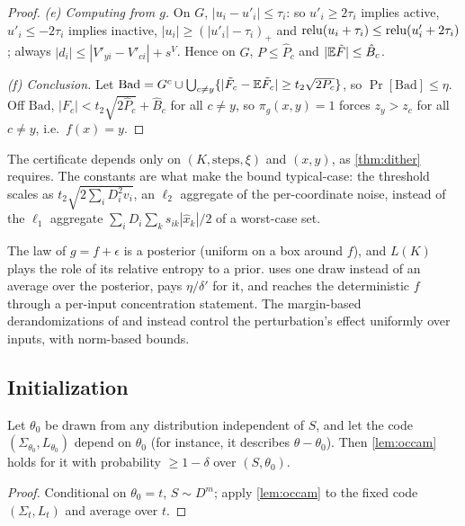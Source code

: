 \begin{proof}
\emph{(e) Computing from $g$.} On $G$, $|u_i-u'_i|\le\tau_i$: so $u'_i\ge2\tau_i$ implies active, $u'_i\le-2\tau_i$ implies inactive, $|u_i|\ge(|u'_i|-\tau_i)_+$ and $\mathrm{relu}(u_i+\tau_i)\le\mathrm{relu}(u'_i+2\tau_i)$; always $|d_i|\le|V'_{yi}-V'_{ci}|+s^V$. Hence on $G$, $P\le\hat P_c$ and $|\mathbb{E}\tilde F|\le\hat B_c$.

\emph{(f) Conclusion.} Let $\mathrm{Bad}=G^c\cup\bigcup_{c\ne y}\{|\tilde F_c-\mathbb{E}\tilde F_c|\ge t_2\sqrt{2P_c}\}$, so $\Pr[\mathrm{Bad}]\le\eta$. Off $\mathrm{Bad}$, $|F_c|<t_2\sqrt{2\hat P_c}+\hat B_c$ for all $c\ne y$, so $\pi_g(x,y)=1$ forces $z_y>z_c$ for all $c\ne y$, i.e.\ $f(x)=y$.
\end{proof}

The certificate depends only on $(K,\text{steps},\xi)$ and $(x,y)$, as \cref{thm:dither} requires. The constants are what make the bound typical-case: the threshold scales as $t_2\sqrt{2\sum_iD_i^2v_i}$, an $\ell_2$ aggregate of the per-coordinate noise, instead of the $\ell_1$ aggregate $\sum_i D_i\sum_ks_{ik}|\hat x_k|/2$ of a worst-case set.

\begin{remark}
The law of $g=f+\epsilon$ is a posterior (uniform on a box around $f$), and $L(K)$ plays the role of its relative entropy to a prior.  uses one draw instead of an average over the posterior, pays $\eta/\delta'$ for it, and reaches the deterministic $f$ through a per-input concentration statement. The margin-based derandomizations of \citet{neyshabur2018pacbayes} and \citet{nagarajan2019deterministic} instead control the perturbation's effect uniformly over inputs, with norm-based bounds.
\end{remark}

\subsection{Initialization}\label{sec:init-theory}

\begin{lemma}\label{lem:init}
Let $\theta_0$ be drawn from any distribution independent of $S$, and let the code $(\Sigma_{\theta_0},L_{\theta_0})$ depend on $\theta_0$ (for instance, it describes $\theta-\theta_0$). Then \cref{lem:occam} holds for it with probability $\ge1-\delta$ over $(S,\theta_0)$.
\end{lemma}
\begin{proof}
Conditional on $\theta_0=t$, $S\sim D^m$; apply \cref{lem:occam} to the fixed code $(\Sigma_t,L_t)$ and average over $t$.
\end{proof}

